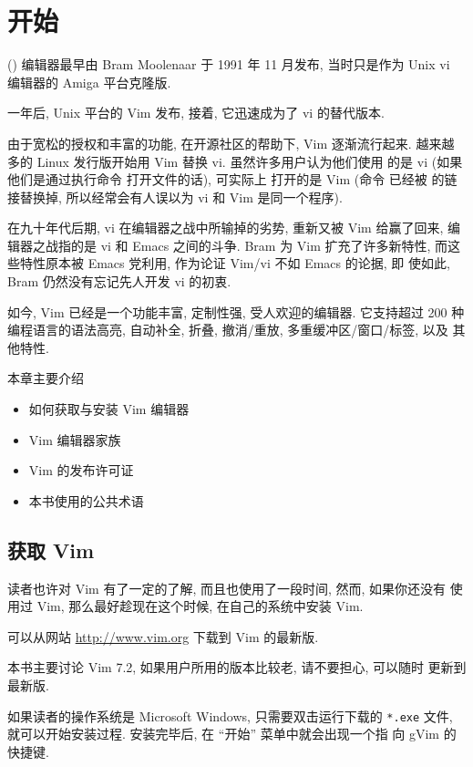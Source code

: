 \chapter{开始}
\label{chap:getting_started_with_vim}

 () 编辑器最早由 Bram Moolenaar 于
1991 年 11 月发布, 当时只是作为 Unix vi 编辑器的 Amiga 平台克隆版.

一年后, Unix 平台的 Vim 发布, 接着, 它迅速成为了 vi 的替代版本.

由于宽松的授权和丰富的功能, 在开源社区的帮助下, Vim 逐渐流行起来.
越来越多的 Linux 发行版开始用 Vim 替换 vi. 虽然许多用户认为他们使用
的是 vi (如果他们是通过执行命令 \vi 打开文件的话), 可实际上
打开的是 Vim (命令 \vi 已经被 \vim 的链接替换掉, 所以经常会有人误以为
vi 和 Vim 是同一个程序).

在九十年代后期, vi 在编辑器之战中所输掉的劣势, 重新又被 Vim 给赢了回来,
编辑器之战指的是 vi 和 Emacs 之间的斗争. Bram 为 Vim 扩充了许多新特性,
而这些特性原本被  Emacs 党利用, 作为论证 Vim/vi 不如 Emacs 的论据, 即
使如此, Bram 仍然没有忘记先人开发 vi 的初衷.

如今, Vim 已经是一个功能丰富, 定制性强, 受人欢迎的编辑器. 它支持超过 200
种编程语言的语法高亮, 自动补全, 折叠, 撤消/重放, 多重缓冲区/窗口/标签, 以及
其他特性.

本章主要介绍
\begin{itemize}
    \item 如何获取与安装 Vim 编辑器
    \item Vim 编辑器家族
    \item Vim 的发布许可证
    \item 本书使用的公共术语
\end{itemize}

\section{获取 Vim}
\label{sec:getting_vim}

读者也许对 Vim 有了一定的了解, 而且也使用了一段时间, 然而, 如果你还没有
使用过 Vim, 那么最好趁现在这个时候, 在自己的系统中安装 Vim.

可以从网站 \url{http://www.vim.org} 下载到 Vim 的最新版.
\begin{warning}
本书主要讨论 Vim 7.2, 如果用户所用的版本比较老, 请不要担心, 可以随时
更新到最新版.
\end{warning}
如果读者的操作系统是 Microsoft Windows, 只需要双击运行下载的 \texttt{*.exe}
文件, 就可以开始安装过程. 安装完毕后, 在 ``开始'' 菜单中就会出现一个指
向 gVim 的快捷键.

